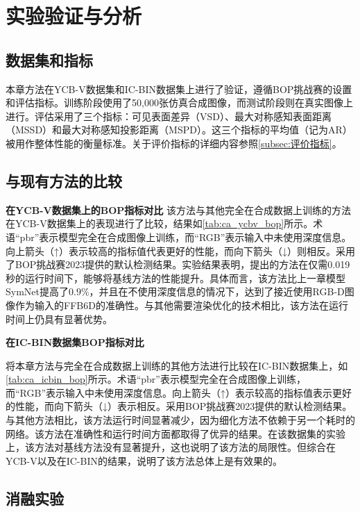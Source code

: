 \section{实验验证与分析}

\subsection{数据集和指标}
本章方法在YCB-V数据集\cite{ycbv}和IC-BIN数据集\cite{icbin}上进行了验证，遵循BOP挑战赛\cite{hodan2024bop}的设置和评估指标。训练阶段使用了50,000张仿真合成图像，而测试阶段则在真实图像上进行。评估采用了三个指标：可见表面差异（VSD）、最大对称感知表面距离（MSSD）和最大对称感知投影距离（MSPD）。这三个指标的平均值（记为AR）被用作整体性能的衡量标准。关于评价指标的详细内容参照\autoref{subsec:评价指标}。

\subsection{与现有方法的比较}

\textbf{在YCB-V数据集上的BOP指标对比 } 该方法与其他完全在合成数据上训练的方法在YCB-V数据集上的表现进行了比较，结果如\autoref{tab:ca_ycbv_bop}所示。术语“pbr”表示模型完全在合成图像上训练，而“RGB”表示输入中未使用深度信息。向上箭头（↑）表示较高的指标值代表更好的性能，而向下箭头（↓）则相反。采用了BOP挑战赛2023\cite{hodan2024bop}提供的默认检测结果。实验结果表明，提出的方法在仅需0.019秒的运行时间下，能够将基线方法的性能提升。具体而言，该方法比上一章模型SymNet\cite{symnet}提高了$0.9\%$，并且在不使用深度信息的情况下，达到了接近使用RGB-D图像作为输入的FFB6D\cite{he2021ffb6d}的准确性。与其他需要渲染优化的技术相比，该方法在运行时间上仍具有显著优势。



\textbf{在IC-BIN数据集BOP指标对比}

将本章方法与完全在合成数据上训练的其他方法进行比较在IC-BIN数据集上，如\autoref{tab:ca_icbin_bop}所示。术语“pbr”表示模型完全在合成图像上训练，而“RGB”表示输入中未使用深度信息。向上箭头（↑）表示较高的指标值表示更好的性能，而向下箭头（↓）表示相反。采用BOP挑战赛2023\cite{hodan2024bop}提供的默认检测结果。与其他方法相比，该方法运行时间显著减少，因为细化方法不依赖于另一个耗时的网络。该方法在准确性和运行时间方面都取得了优异的结果。在该数据集的实验上，该方法对基线方法没有显著提升，这也说明了该方法的局限性。但综合在YCB-V以及在IC-BIN的结果，说明了该方法总体上是有效果的。



\subsection{消融实验}


